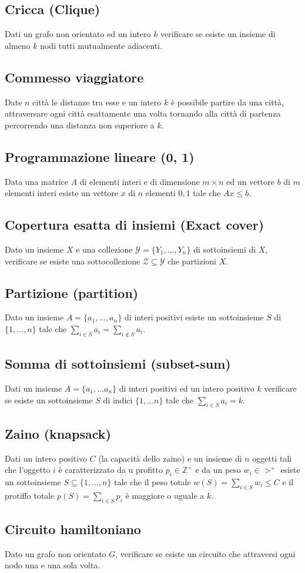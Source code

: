 \subsection{Cricca (Clique)}
Dati un grafo non orientato ed un intero $k$ verificare se esiste un insieme di almeno $k$ nodi tutti mutualmente adiacenti.
\subsection{Commesso viaggiatore}
Date $n$ citt\`a le distanze tra esse e un intero $k$ \`e possibile partire da una citt\`a, attraversare ogni citt\`a esattamente una volta tornando alla citt\`a di partenza percorrendo
una distanza non superiore a $k$.
\subsection{Programmazione lineare (0, 1)}
Data una matrice $A$ di elementi interi e di dimensione $m\times n$ ed un vettore $b$ di $m$ elementi interi esiste un vettore $x$ di $n$ elementi $0, 1$ tale che $Ax\le b$.
\subsection{Copertura esatta di insiemi (Exact cover)}
Dato un insieme $X$ e una collezione $\mathcal{Y}=\{Y_1, \dots, Y_n\}$ di sottoinsiemi di $X$, verificare se esiste una sottocollezione $\mathcal{Z}\subseteq\mathcal{Y}$ che partizioni 
$X$.
\subsection{Partizione (partition)}
Dato un insieme $A=\{a_1, \dots, a_n\}$ di interi positivi esiste un sottoinsieme $S$ di $\{1, \dots,n\}$ tale che $\sum\limits_{i\in S}a_i = \sum\limits_{i\not\in S}a_i$.
\subsection{Somma di sottoinsiemi (subset-sum)}
Dati un insieme $A=\{a_1,\dots a_n\}$ di interi positivi ed un intero positivo $k$ verificare se esiste un sottoinsieme $S$ di indici $\{1, \dots n\}$ tale che 
$\sum\limits_{i\in S}a_i = k$.
\subsection{Zaino (knapsack)}
Dati un intero positivo $C$ (la capacit\`a dello zaino) e un insieme di $n$ oggetti tali che l'oggetto $i$ \`e caratterizzato da u profitto $p_i\in \mathbb{Z}^+$ e da un peso 
$w_i\in\mathbb{>}^+$ esiste un sottoinsieme $S\subseteq\{1, \dots, n\}$ tale che il peso totale $w(S)=\sum\limits_{i\in S} w_i\le C$ e il protiffo totale $p(S) = \sum\limits_{i\in S}p_i$
\`e maggiore o uguale a $k$.
\subsection{Circuito hamiltoniano}
Dato un grafo non orientato $G$, verificare se esiste un circuito che attraversi ogni nodo una e una sola volta.


